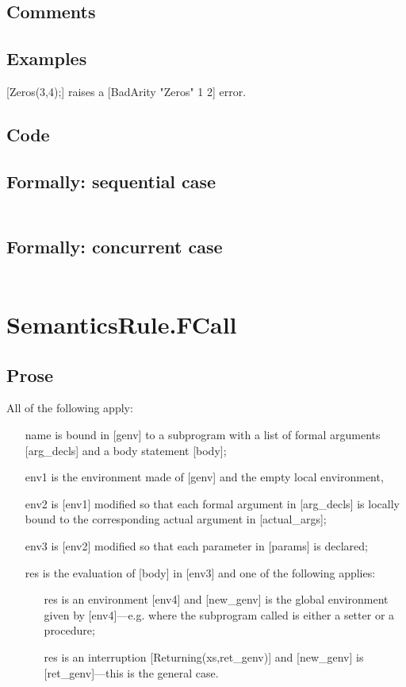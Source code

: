 \documentclass{book}
\begin{document}
  \subsection{Comments}

  \subsection{Examples}
  [Zeros(3,4);] raises a [BadArity "Zeros" 1 2] error.

  \subsection{Code}

  \subsection{Formally: sequential case}
  \begin{align}
  \end{align} 

  \subsection{Formally: concurrent case}
  \begin{align}
  \end{align} 

\section{SemanticsRule.FCall \label{sec:SemanticsRule.FCall}}

  \subsection{Prose}
  All of the following apply:
  \begin{itemize}
  \item [name] is bound in [genv] to a subprogram with a list of formal arguments
    [arg\_decls] and a body statement [body];
  \item [env1] is the environment made of [genv] and the empty local environment,
  \item [env2] is [env1] modified so that each formal argument in [arg\_decls] is
    locally bound to the corresponding actual argument in [actual\_args];
  \item [env3] is [env2] modified so that each parameter in [params] is declared;
  \item [res] is the evaluation of [body] in [env3] and one of the following
    applies:
      \begin{itemize}
      \item [res] is an environment [env4] and [new\_genv] is the global environment
        given by [env4]---e.g. where the subprogram called is either a setter or
        a procedure;
      \item [res] is an interruption [Returning(xs,ret\_genv)] and [new\_genv] is
        [ret\_genv]---this is the general case.
      \end{itemize}
  \end{itemize}
\end{document}
